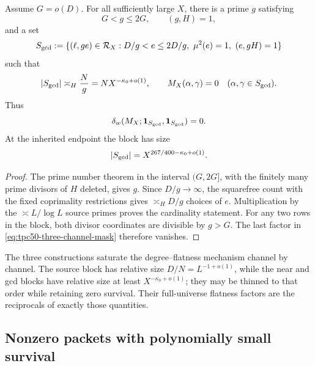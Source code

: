 \begin{proposition}
\label{prop:tpc50-gcd-block}
Assume \(G=o(D)\).  For all sufficiently large \(X\), there is a prime
\(g\) satisfying
\begin{equation}
 G<g\le2G,
 \qquad (g,H)=1,
 \label{eq:tpc50-gcd-prime}
\end{equation}
and a set
\begin{equation}
 S_{\rm gcd}
 :=\{(\ell,ge)\in\mathcal R_X:
 D/g<e\le2D/g,\ \mu^2(e)=1,\ (e,gH)=1\}
 \label{eq:tpc50-gcd-block}
\end{equation}
such that
\begin{equation}
 |S_{\rm gcd}|\asymp_H\frac Ng
 =NX^{-\kappa_0+o(1)},
 \qquad
 M_X(\alpha,\gamma)=0
 \quad(\alpha,\gamma\in S_{\rm gcd}).
 \label{eq:tpc50-gcd-block-data}
\end{equation}
Thus
\begin{equation}
 \delta_w(M_X;\mathbf 1_{S_{\rm gcd}},\mathbf 1_{S_{\rm gcd}})=0.
 \label{eq:tpc50-gcd-zero-survival}
\end{equation}
At the inherited endpoint the block has size
\begin{equation}
 |S_{\rm gcd}|
 =X^{267/400-\kappa_0+o(1)}.
 \label{eq:tpc50-gcd-block-endpoint}
\end{equation}
\end{proposition}

\begin{proof}
The prime number theorem in the interval \((G,2G]\), with the finitely
many prime divisors of \(H\) deleted, gives \(g\).  Since \(D/g\to
\infty\), the squarefree count with the fixed coprimality restrictions
gives \(\asymp_H D/g\) choices of \(e\).  Multiplication by the
\(\asymp L/\log L\) source primes proves the cardinality statement.
For any two rows in the block, both divisor coordinates are divisible
by \(g>G\).  The last factor in
\eqref{eq:tpc50-three-channel-mask} therefore vanishes.
\end{proof}

The three constructions saturate the degree--flatness mechanism
channel by channel.  The source block has relative size
\(D/N=L^{-1+o(1)}\), while the near and gcd blocks have relative size
at least \(X^{-\kappa_0+o(1)}\); they may be thinned to that order while
retaining zero survival.  Their full-universe flatness factors are the
reciprocals of exactly those quantities.

\subsection{Nonzero packets with polynomially small survival}

